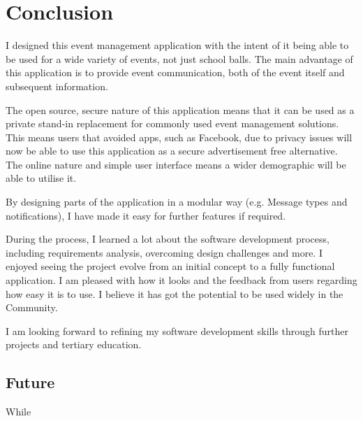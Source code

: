 \documentclass[a4paper,oneside,12pt]{report}
\begin{document}

	\chapter{Conclusion}
	I designed this event management application with the intent of it being able to be used for a wide variety of events, not just school balls.  The main advantage of this application is to provide event communication, both of the event itself and subsequent information. 
    
    The open source, secure nature of this application means that it can be used as a private stand-in replacement for commonly used event management solutions. This means users that avoided apps, such as Facebook, due to privacy issues will now be able to use this application as a secure advertisement free alternative. The online nature and simple user interface means a wider demographic will be able to utilise it.
    
    By designing parts of the application in a modular way (e.g. Message types and notifications), I have made it easy for further features if required.
    
    During the process, I learned a lot about the software development process, including requirements analysis, overcoming design challenges and more. I enjoyed seeing the project evolve from an initial concept to a fully functional application. I am pleased with how it looks and the feedback from users regarding how easy it is to use. I believe it has got the potential to be used widely in the Community.
	
	I am looking forward to refining my software development skills through further projects and tertiary education.
	
	\section{Future}
	While

	\printbibliography

	\printglossaries
\end{document}
